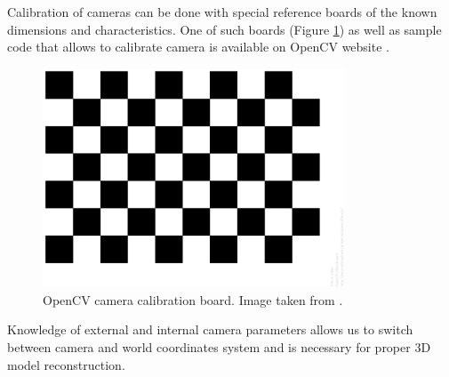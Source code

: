 Calibration of cameras can be done with special reference boards of the known dimensions and characteristics. One of such boards (Figure \ref{fig:camera_model}) as well as sample code that allows to calibrate camera is available on OpenCV website \cite{website:cameraCalibration}.
\begin{figure}[h!]
    \centering
    \includegraphics[width=0.8\textwidth]{opencv_camera_calib}
    \caption{OpenCV camera calibration board. Image taken from \cite{website:cameraCalibration}.}
    \label{fig:camera_model}
\end{figure}
Knowledge of external and internal camera parameters allows us to switch between camera and world coordinates system and is necessary for proper 3D model reconstruction.

